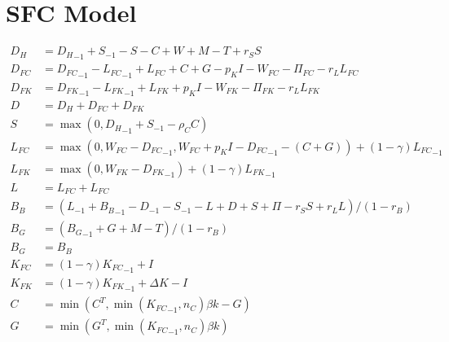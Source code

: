 \documentclass{article}
\begin{document}
\section{SFC Model}
\begin{align}
    D_H          & = {D_H}_{-1} + S_{-1} - S - C+ W + M - T +r_S S                                                          \\
    D_{FC}       & = {D_{FC}}_{-1} - {L_{FC}}_{-1} + L_{FC} + C + G - p_K I - W_{FC} - \Pi_{FC} - r_L L_{FC}                \\
    D_{FK}       & = {D_{FK}}_{-1} - {L_{FK}}_{-1} + L_{FK} + p_K I - W_{FK} - \Pi_{FK} - r_L L_{FK}                        \\
    D            & = D_H + D_{FC} + D_{FK}                                                                                  \\
    S            & = \max(0, {D_H}_{-1} + S_{-1} - \rho_C C)                                                                \\
    L_{FC}       & = \max(0, W_{FC} - {D_{FC}}_{-1}, W_{FC} + p_K I - {D_{FC}}_{-1} - (C+G)) + (1-\gamma){L_{FC}}_{-1}      \\
    L_{FK}       & = \max(0, W_{FK} - {D_{FK}}_{-1}) + (1-\gamma){L_{FK}}_{-1}                                              \\
    L            & = L_{FC} + L_{FC}                                                                                        \\
    B_B          & = (L_{-1} + {B_B}_{-1} - D_{-1} - S_{-1} - L + D + S + \Pi - r_S S + r_L L) / (1- r_B)                   \\
    B_G          & = ({B_G}_{-1} + G + M - T) / (1 - r_B)                                                                   \\
    B_G          & = B_B                                                                                                    \\
    K_{FC}       & = (1-\gamma) {K_{FC}}_{-1} + I                                                                           \\
    K_{FK}       & = (1-\gamma) {K_{FK}}_{-1} + \Delta K - I                                                                \\
    C            & = \min(C^T, \min({K_{FC}}_{-1}, n_C) \beta k - G)                                                        \\
    G            & = \min(G^T, \min({K_{FC}}_{-1}, n_C) \beta k)                                                            \\

\end{align}
\end{document}
